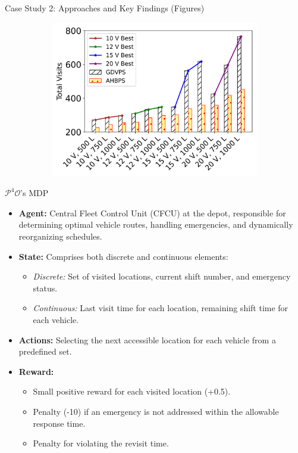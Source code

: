 \documentclass{beamer}
\begin{document}
\begin{frame}{Case Study 2: Approaches and Key Findings (Figures)}
\begin{figure}[t]
\begin{subfigure}{0.315\textwidth}
        \centering
        \includegraphics[width=\textwidth]{figs/large_acc_corrected (1).png}
        \caption{}
    \end{subfigure}
    \label{Fig_Highway_Farama}
\end{figure}
\end{frame}

\begin{frame}{$\mathcal{P}^4\mathcal{O}$'s MDP}
  \begin{itemize}[<+->]
    \item \textbf{Agent:} Central Fleet Control Unit (CFCU) at the depot, responsible for determining optimal vehicle routes, handling emergencies, and dynamically reorganizing schedules.
    \pause
    \item \textbf{State:} Comprises both discrete and continuous elements:
      \begin{itemize}[<+->]
        \item \emph{Discrete:} Set of visited locations, current shift number, and emergency status.
        \item \emph{Continuous:} Last visit time for each location, remaining shift time for each vehicle.
      \end{itemize}
    \pause
    \item \textbf{Actions:} Selecting the next accessible location for each vehicle from a predefined set.
    \pause
    \item \textbf{Reward:}
      \begin{itemize}[<+->]
        \item Small positive reward for each visited location (+0.5).
        \item Penalty (-10) if an emergency is not addressed within the allowable response time.
        \item Penalty for violating the revisit time.
      \end{itemize}
    \pause
  \end{itemize}
\end{frame}
\end{document}
